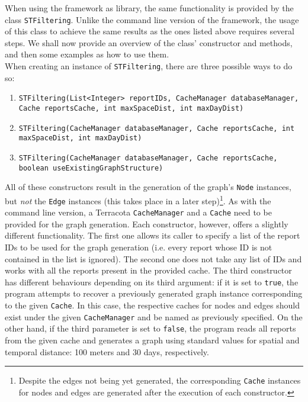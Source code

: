 \documentclass{article}
\begin{document}
		When using the framework as library, the same functionality is provided by the class 
		\texttt{STFiltering}. Unlike the command line version of the framework, the usage of this
		class to achieve the same results as the ones listed above requires several steps. We 
		shall now provide an overview of the class' constructor and methods, and then some examples
		as how to use them.\\
		When creating an instance of \texttt{STFiltering}, there are three possible ways to do so:
		\begin{enumerate}
			\item \texttt{STFiltering(List<Integer> reportIDs, CacheManager databaseManager,
				Cache reportsCache, int maxSpaceDist, int maxDayDist)}
			\item \texttt{STFiltering(CacheManager databaseManager, Cache reportsCache,
			int maxSpaceDist, int maxDayDist)}
			\item \texttt{STFiltering(CacheManager databaseManager, Cache reportsCache,
			boolean useExistingGraphStructure)}
		\end{enumerate}
		All of these constructors result in the generation of the graph's \texttt{Node} instances, but 
		\emph{not} the \texttt{Edge} instances (this takes place in a later step)\footnote{Despite
		the edges not being yet generated, the corresponding \texttt{Cache} instances for nodes and edges
		are generated after the execution of each constructor.}. As with the command
		line version, a Terracota \texttt{CacheManager} and a \texttt{Cache} need to be provided for
		the graph generation. Each constructor, however, offers a slightly different functionality.
		The first one allows its caller to specify a list of the report IDs to be used for the graph 
		generation (i.e. every report whose ID is not contained in the list is ignored).
		The second one does not take any list of IDs and works with all the reports present in the provided
		cache. The third constructor has different behaviours depending on its third argument: 
		if it is set to \texttt{true}, the program attempts to recover a previously generated 
		graph instance corresponding to the given \texttt{Cache}. In this case, the respective 
		caches for nodes and edges should exist under the given \texttt{CacheManager} and be named 
		as previously specified. On the other hand, if the third parameter is set to
		\texttt{false}, the program reads all reports from the given cache and generates a graph using
		standard values for spatial and temporal distance: 100 meters and 30 days, respectively.\\
\end{document}
